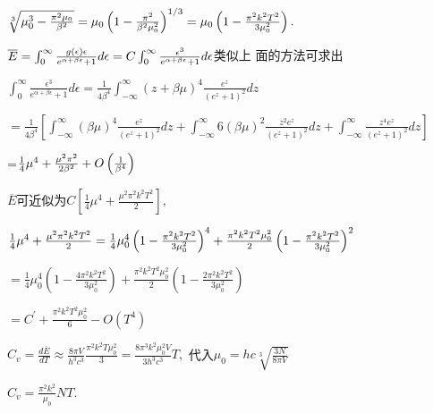 \documentclass{ctexart}
\begin{document}
$\sqrt[3]{\mu _{0}^{3}-\frac{\pi ^{2}\mu _{0}}{\beta ^{2}}}=\mu _{0}\left( 1-%
\frac{\pi ^{2}}{\beta ^{2}\mu _{0}^{2}}\right) ^{1/3}=\mu _{0}\left( 1-\frac{%
\pi ^{2}k^{2}T^{2}}{3\mu _{0}^{2}}\right) .$

$\overline{E}=\int_{0}^{\infty }\frac{g\left( \epsilon \right) \epsilon }{%
e^{\alpha +\beta \epsilon }+1}d\epsilon =C\int_{0}^{\infty }\frac{\epsilon
^{3}}{e^{\alpha +\beta \epsilon }+1}d\epsilon $类似上%
面的方法可求出

$\int_{0}^{\infty }\frac{\epsilon ^{3}}{e^{\alpha +\beta \epsilon }+1}%
d\epsilon =\frac{1}{4\beta ^{4}}\int_{-\infty }^{\infty }\left( z+\beta \mu
\right) ^{4}\frac{e^{z}}{\left( e^{z}+1\right) ^{2}}dz$

$=\frac{1}{4\beta ^{4}}\left[ \int_{-\infty }^{\infty }\left( \beta \mu
\right) ^{4}\frac{e^{z}}{\left( e^{z}+1\right) ^{2}}dz+\int_{-\infty
}^{\infty }6\left( \beta \mu \right) ^{2}\frac{z^{2}e^{z}}{\left(
e^{z}+1\right) ^{2}}dz+\int_{-\infty }^{\infty }\frac{z^{4}e^{z}}{\left(
e^{z}+1\right) ^{2}}dz\right] $

=$\frac{1}{4}\mu ^{4}+\frac{\mu ^{2}\pi ^{2}}{2\beta ^{2}}+O\left( \frac{1}{%
\beta ^{4}}\right) $

$\overline{E}$可近似为$C\left[ \frac{1}{4}\mu ^{4}+%
\frac{\mu ^{2}\pi ^{2}k^{2}T^{2}}{2}\right] ,$

$\frac{1}{4}\mu ^{4}+\frac{\mu ^{2}\pi ^{2}k^{2}T^{2}}{2}=\frac{1}{4}\mu
_{0}^{4}\left( 1-\frac{\pi ^{2}k^{2}T^{2}}{3\mu _{0}^{2}}\right) ^{4}+\frac{%
\pi ^{2}k^{2}T^{2}\mu _{0}^{2}}{2}\left( 1-\frac{\pi ^{2}k^{2}T^{2}}{3\mu
_{0}^{2}}\right) ^{2}$

$=\frac{1}{4}\mu _{0}^{4}\left( 1-\frac{4\pi ^{2}k^{2}T^{2}}{3\mu _{0}^{2}}%
\right) +\frac{\pi ^{2}k^{2}T^{2}\mu _{0}^{2}}{2}\left( 1-\frac{2\pi
^{2}k^{2}T^{2}}{3\mu _{0}^{2}}\right) $

$=C^{\prime }+\frac{\pi ^{2}k^{2}T^{2}\mu _{0}^{2}}{6}-O\left( T^{4}\right) $

$C_{v}=\frac{d\overline{E}}{dT}\approx \frac{8\pi V}{h^{3}c^{3}}\frac{\pi
^{2}k^{2}T\mu _{0}^{2}}{3}=\frac{8\pi ^{3}k^{2}\mu _{0}^{2}V}{3h^{3}c^{3}}T,$%
代入$\mu _{0}=hc\sqrt[3]{\frac{3N}{8\pi V}}$

$C_{v}=\frac{\pi ^{2}k^{2}}{\mu _{0}}NT.$
\end{document}
